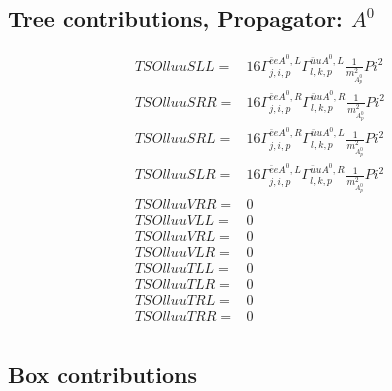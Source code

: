 \documentclass[A4,landscape]{article}
\begin{document}
\subsection{Tree contributions, Propagator: $A^0$} 

\begin{align} 
  TSOlluuSLL= & 16 \Gamma^{\bar{e}e A^0 ,L}_{j, i, p} \Gamma^{\bar{u}u A^0 ,L}_{l, k, p} \frac{1}{m^2_{A^0_{{p}}}} Pi^2 \\ 
  TSOlluuSRR= & 16 \Gamma^{\bar{e}e A^0 ,R}_{j, i, p} \Gamma^{\bar{u}u A^0 ,R}_{l, k, p} \frac{1}{m^2_{A^0_{{p}}}} Pi^2 \\ 
  TSOlluuSRL= & 16 \Gamma^{\bar{e}e A^0 ,R}_{j, i, p} \Gamma^{\bar{u}u A^0 ,L}_{l, k, p} \frac{1}{m^2_{A^0_{{p}}}} Pi^2 \\ 
  TSOlluuSLR= & 16 \Gamma^{\bar{e}e A^0 ,L}_{j, i, p} \Gamma^{\bar{u}u A^0 ,R}_{l, k, p} \frac{1}{m^2_{A^0_{{p}}}} Pi^2 \\ 
  TSOlluuVRR= & 0 \\ 
  TSOlluuVLL= & 0 \\ 
  TSOlluuVRL= & 0 \\ 
  TSOlluuVLR= & 0 \\ 
  TSOlluuTLL= & 0 \\ 
  TSOlluuTLR= & 0 \\ 
  TSOlluuTRL= & 0 \\ 
  TSOlluuTRR= & 0 \\ 
\end{align} 
\subsection{Box contributions} 
\end{document}
